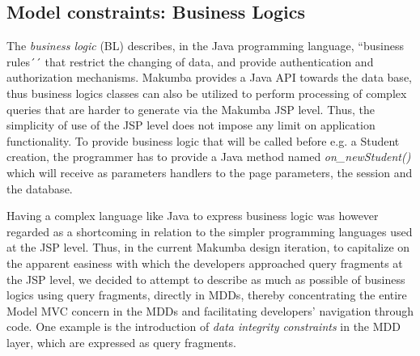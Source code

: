 \documentclass{chi2009}
\begin{document}
\subsection{Model constraints: Business Logics}
The \textit{business logic} (BL) describes, in the Java programming language, ``business rules´´ that restrict the changing of data, and provide authentication and authorization mechanisms. Makumba provides a Java API towards the data base, thus business logics classes can also be utilized to perform processing of complex queries that are harder to generate via the Makumba JSP level. Thus, the simplicity of use of the JSP level does not impose any limit on application functionality. To provide business logic that will be called before e.g. a Student creation, the programmer has to provide a Java method named \textit{on\_newStudent()} which will receive as parameters handlers to the page parameters, the session and the database.




Having a complex language like Java to express business logic was however regarded as a shortcoming in relation to the simpler programming languages used at the JSP level. Thus, in the current Makumba design iteration, to capitalize on the apparent easiness with which the developers approached query fragments at the JSP level, we decided to attempt to describe as much as possible of business logics using query fragments, directly in MDDs, thereby concentrating the entire Model MVC concern in the MDDs and facilitating developers' navigation through code. One example is the introduction of \textit{data integrity constraints} in the MDD layer, which are expressed as query fragments. 
\end{document}
